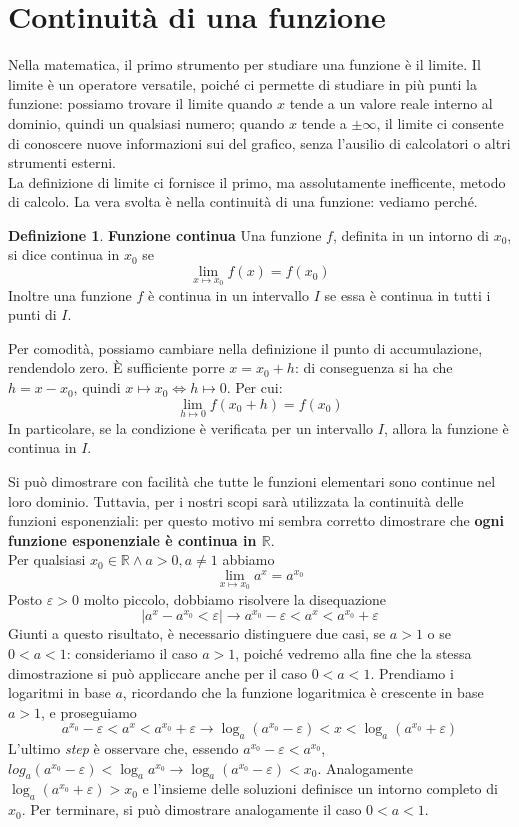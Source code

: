 \documentclass[a3paper, twoside, openany]{book}
\theoremstyle{definition}
\newtheorem{definition}{Definizione}
\begin{document}
\section{Continuità di una funzione}\label{sec:continuità}
Nella matematica, il primo strumento per studiare una funzione è il limite. Il limite è un operatore versatile, poiché ci permette di studiare in più punti la funzione: possiamo trovare il limite quando $x$ tende a un valore reale interno al dominio, quindi un qualsiasi numero; quando $x$ tende a $\pm\infty$, il limite ci consente di conoscere nuove informazioni sui  del grafico, senza l'ausilio di calcolatori o altri strumenti esterni. \\ La definizione di limite ci fornisce il primo, ma assolutamente inefficente, metodo di calcolo. La vera svolta è nella continuità di una funzione: vediamo perché.
\begin{definition}{\textbf{Funzione continua}} Una funzione $f$, definita in un intorno di $x_0$, si dice continua in $x_0$ se $$\lim_{x\mapsto x_0}f(x)=f(x_0)$$ Inoltre una funzione $f$ è continua in un intervallo $I$ se essa è continua in tutti i punti di $I$.\end{definition} Per comodità, possiamo cambiare nella definizione il punto di accumulazione, rendendolo zero. È sufficiente porre $x=x_0+h$: di conseguenza si ha che $h=x-x_0$, quindi $x\mapsto x_0\Longleftrightarrow h\mapsto 0$. Per cui: $$\lim_{h\mapsto 0}f(x_0+h)=f(x_0)$$ In particolare, se la condizione è verificata per un intervallo $I$, allora la funzione è continua in $I$. \par
Si può dimostrare con facilità che tutte le funzioni elementari sono continue nel loro dominio. Tuttavia, per i nostri scopi sarà utilizzata la continuità delle funzioni esponenziali: per questo motivo mi sembra corretto dimostrare che \textbf{ogni funzione esponenziale è continua in $\mathbb{R}$}. \\ Per qualsiasi $x_0\in \mathbb{R}\wedge a>0,a\neq1$ abbiamo $$\lim_{x\mapsto x_0}a^x=a^{x_0}$$ Posto $\varepsilon > 0$ molto piccolo, dobbiamo risolvere la disequazione $$|a^x-a^{x_0}<\varepsilon|\longrightarrow a^{x_0}-\varepsilon<a^x<a^{x_0}+\varepsilon$$ Giunti a questo risultato, è necessario distinguere due casi, se $a>1$ o se $0<a<1$: consideriamo il caso $a>1$, poiché vedremo alla fine che la stessa dimostrazione si può appliccare anche per il caso $0<a<1$. Prendiamo i logaritmi in base $a$, ricordando che la funzione logaritmica è crescente in base $a>1$, e proseguiamo $$a^{x_0}-\varepsilon<a^x<a^{x_0}+\varepsilon\longrightarrow \log_a{\left(a^{x_0}-\varepsilon\right)}<x<\log_a{\left(a^{x_0}+\varepsilon\right)}$$ L'ultimo \emph{step} è osservare che, essendo $a^{x_0}-\varepsilon<a^{x_0}$, $log_a{\left(a^{x_0}-\varepsilon\right)}<\log_a{a^{x_0}}\rightarrow \log_a{\left(a^{x_0}-\varepsilon\right)}<x_0$. Analogamente $\log_a{\left(a^{x_0}+\varepsilon\right)}>x_0$ e l'insieme delle soluzioni definisce un intorno completo di $x_0$. Per terminare, si può dimostrare analogamente il caso $0<a<1$. \par
\end{document}
